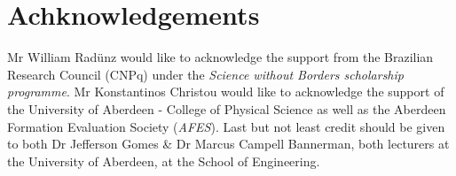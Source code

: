 \documentclass[preprint,authoryear,12pt]{elsarticle}
\begin{document}

\section{Achknowledgements}
Mr William Rad\"unz would like to acknowledge the support from the Brazilian Research Council (CNPq) under the \textit{Science without Borders scholarship programme}. Mr Konstantinos Christou would like to acknowledge the support of the University of Aberdeen - College of Physical Science as well as the Aberdeen Formation Evaluation Society (\textit{AFES}). Last but not least credit should be given to both Dr Jefferson Gomes \& Dr Marcus Campell Bannerman, both lecturers at the University of Aberdeen, at the School of Engineering.


   







\pagebreak
\clearpage

%

\pagebreak
\clearpage

\listoffigures
\end{document}
